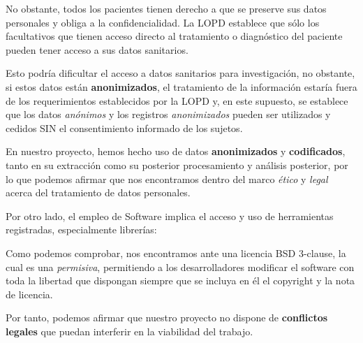 No obstante, todos los pacientes tienen derecho a que se preserve sus datos personales y obliga a la confidencialidad. La LOPD establece que sólo los facultativos que tienen acceso directo al tratamiento o diagnóstico del paciente pueden tener acceso a sus datos sanitarios.

Esto podría dificultar el acceso a datos sanitarios para investigación, no obstante, si estos datos están \textbf{anonimizados}, el tratamiento de la información estaría fuera de los requerimientos establecidos por la LOPD y, en este supuesto, se establece que los datos \textit{anónimos} y los registros \textit{anonimizados} pueden ser utilizados y cedidos SIN el consentimiento informado de los sujetos\cite{GarridoElustondo2012InvestigacionPrimaria}.

En nuestro proyecto, hemos hecho uso de datos \textbf{anonimizados} y \textbf{codificados}, tanto en su extracción como su posterior procesamiento y análisis posterior, por lo que podemos afirmar que nos encontramos dentro del marco \textit{ético} y \textit{legal} acerca del tratamiento de datos personales.

Por otro lado, el empleo de Software implica el acceso y uso de herramientas registradas, especialmente librerías:


Como podemos comprobar, nos encontramos ante una licencia BSD 3-clause, la cual es una \textit{permisiva}, permitiendo a los desarrolladores modificar el software con toda la libertad que dispongan siempre que se incluya en él el copyright y la nota de licencia.

Por tanto, podemos afirmar que nuestro proyecto no dispone de \textbf{conflictos legales} que puedan interferir en la viabilidad del trabajo.
